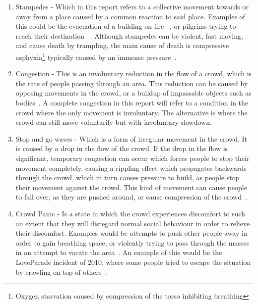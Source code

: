 \begin{enumerate}
    \item Stampedes - Which in this report refers to a collective movement towards or away from a place caused by a common reaction to said place. Examples of this could be the evacuation of a building on fire~ \cite{website:Wikipedia-stationclubfire}, or pilgrims trying to reach their destination ~\cite{website:Wikipedia-minastampede}. Although stampedes can be violent, fast moving, and cause death by trampling, the main cause of death is compressive asphyxia\footnote{Oxygen starvation caused by compression of the torso inhibiting breathing} typically caused by an immense pressure~\cite{fruincauses}.
    
    \item Congestion - This is an involuntary reduction in the flow of a crowd, which is the rate of people passing through an area. This reduction can be caused by opposing movements in the crowd, or a buildup of impassable objects such as bodies~\cite{ website:Wikipedia-stationclubfire,website:Wikipedia-meccatunnel}. A complete congestion in this report will refer to a condition in the crowd where the only movement is involuntary. The alternative is where the crowd can still move voluntarily but with involuntary slowdown.
    
    
    \item Stop and go waves - Which is a form of irregular movement in the crowd. It is caused by a drop in the flow of the crowd. If the drop in the flow is significant, temporary congestion can occur which forces people to stop their movement completely, causing a rippling effect which propagates backwards through the crowd, which in turn causes pressure to build, as people stop their movement against the crowd. This kind of movement can cause people to fall over, as they are pushed around, or cause compression of the crowd~\cite{empircalstudy,videoanalysis}.
    
    \item Crowd Panic - Is a state in which the crowd experiences discomfort to such an extent that they will disregard normal social behaviour in order to relieve their discomfort. Examples would be attempts to push other people away in order to gain breathing space, or violently trying to pass through the masses in an attempt to vacate the area~\cite{empircalstudy}. An example of this would be the LoveParade incident of 2010, where some people tried to escape the situation by crawling on top of others~\cite{loveParadeDisaster}.
    
\end{enumerate}

